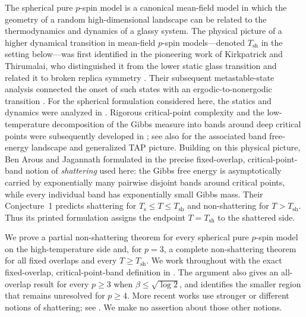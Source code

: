 \documentclass[11pt,reqno]{amsart}
\numberwithin{equation}{section}
\theoremstyle{plain}
\theoremstyle{definition}
\theoremstyle{remark}
\newcommand{\1}{\mathbf 1}
\begin{document}
The spherical pure \(p\)-spin model is a canonical mean-field model in which the geometry of a random high-dimensional landscape can be related to the thermodynamics and dynamics of a glassy system.  The physical picture of a higher dynamical transition in mean-field \(p\)-spin models---denoted \(T_{\mathrm{sh}}\) in the setting below---was first identified in the pioneering work of Kirkpatrick and Thirumalai, who distinguished it from the lower static glass transition and related it to broken replica symmetry \cite{KirkpatrickThirumalai1987Dynamics,KirkpatrickThirumalai1987Connections}.  Their subsequent metastable-state analysis connected the onset of such states with an ergodic-to-nonergodic transition \cite{KirkpatrickThirumalai1988Metastable}.  For the spherical formulation considered here, the statics and dynamics were analyzed in \cite{CrisantiSommers1992,CrisantiHornerSommers1993}.  Rigorous critical-point complexity and the low-temperature decomposition of the Gibbs measure into bands around deep critical points were subsequently developed in \cite{AuffingerBenArousCerny2013,Subag2017Geometry}; see also \cite{Subag2024Landscapes} for the associated band free-energy landscape and generalized TAP picture.  Building on this physical picture, Ben Arous and Jagannath formulated in \cite{BenArousJagannath2024} the precise fixed-overlap, critical-point-band notion of \emph{shattering} used here: the Gibbs free energy is asymptotically carried by exponentially many pairwise disjoint bands around critical points, while every individual band has exponentially small Gibbs mass.  Their Conjecture~1 predicts shattering for \(T_{\mathrm{s}}\leq T\leq T_{\mathrm{sh}}\) and non-shattering for \(T>T_{\mathrm{sh}}\).  Thus its printed formulation assigns the endpoint \(T=T_{\mathrm{sh}}\) to the shattered side.

We prove a partial non-shattering theorem for every spherical pure \(p\)-spin model on the high-temperature side and, for \(p=3\), a complete non-shattering theorem for all fixed overlaps and every \(T\geq T_{\mathrm{sh}}\).  We work throughout with the exact fixed-overlap, critical-point-band definition in \cite[Definition~2.3]{BenArousJagannath2024}.  The argument also gives an all-overlap result for every \(p\geq3\) when \(\beta\leq\sqrt{\log2}\), and identifies the smaller region that remains unresolved for \(p\geq4\).  More recent works use stronger or different notions of shattering; see \cite{ElAlaouiMontanariSellke2025,AuffingerElAlaouiSellke2025}.  We make no assertion about those other notions.
\end{document}
